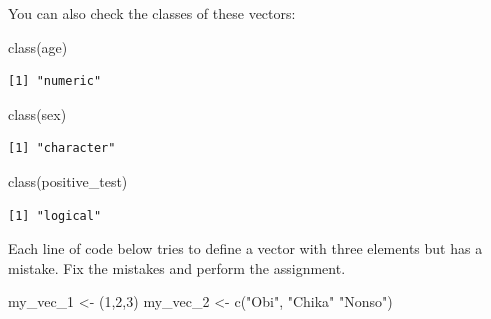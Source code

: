 \documentclass[
  letterpaper,
  DIV=11,
  numbers=noendperiod]{scrreprt}
\newenvironment{Shaded}{\begin{snugshade}}{\end{snugshade}}
\newcommand{\DecValTok}[1]{\textcolor[rgb]{0.68,0.00,0.00}{#1}}
\newcommand{\FunctionTok}[1]{\textcolor[rgb]{0.28,0.35,0.67}{#1}}
\newcommand{\NormalTok}[1]{\textcolor[rgb]{0.00,0.23,0.31}{#1}}
\newcommand{\OtherTok}[1]{\textcolor[rgb]{0.00,0.23,0.31}{#1}}
\newcommand{\StringTok}[1]{\textcolor[rgb]{0.13,0.47,0.30}{#1}}
\begin{document}
You can also check the classes of these vectors:

\begin{Shaded}
\begin{Highlighting}[]
\FunctionTok{class}\NormalTok{(age)}
\end{Highlighting}
\end{Shaded}

\begin{verbatim}
[1] "numeric"
\end{verbatim}

\begin{Shaded}
\begin{Highlighting}[]
\FunctionTok{class}\NormalTok{(sex)}
\end{Highlighting}
\end{Shaded}

\begin{verbatim}
[1] "character"
\end{verbatim}

\begin{Shaded}
\begin{Highlighting}[]
\FunctionTok{class}\NormalTok{(positive\_test)}
\end{Highlighting}
\end{Shaded}

\begin{verbatim}
[1] "logical"
\end{verbatim}

\begin{tcolorbox}[enhanced jigsaw, colframe=quarto-callout-tip-color-frame, rightrule=.15mm, opacityback=0, breakable, coltitle=black, colbacktitle=quarto-callout-tip-color!10!white, bottomrule=.15mm, leftrule=.75mm, toprule=.15mm, arc=.35mm, bottomtitle=1mm, colback=white, left=2mm, opacitybacktitle=0.6, titlerule=0mm, title=\textcolor{quarto-callout-tip-color}{\faLightbulb}\hspace{0.5em}{Practice}, toptitle=1mm]

Each line of code below tries to define a vector with three elements but
has a mistake. Fix the mistakes and perform the assignment.

\begin{Shaded}
\begin{Highlighting}[]
\NormalTok{my\_vec\_1 }\OtherTok{\textless{}{-}}\NormalTok{ (}\DecValTok{1}\NormalTok{,}\DecValTok{2}\NormalTok{,}\DecValTok{3}\NormalTok{)}
\NormalTok{my\_vec\_2 }\OtherTok{\textless{}{-}} \FunctionTok{c}\NormalTok{(}\StringTok{"Obi"}\NormalTok{, }\StringTok{"Chika"} \StringTok{"Nonso"}\NormalTok{)}
\end{Highlighting}
\end{Shaded}

\end{tcolorbox}
\end{document}
